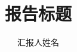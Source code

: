 \documentclass[aspectratio=169,11pt]{beamer}
\title{报告标题}
\subtitle{}
\author{汇报人姓名}
\institute{鹏城实验室}
\date{\PCLCurrentYearMonth}
\begin{document}
\PCLTitleFrame



\PCLClosingFrame
\end{document}
